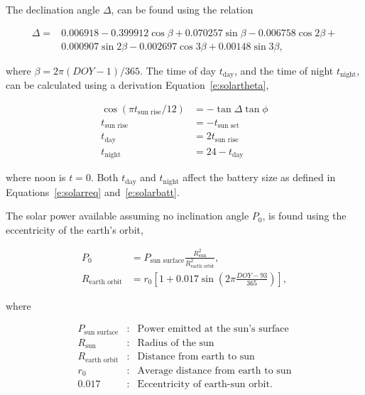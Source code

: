 \documentclass[]{aiaa-tc}%
\begin{document}
 The declination angle $\Delta$, can be found using the relation\cite{solar} 

    \begin{align}
        \label{e:solardelta}
        \Delta = &0.006918 - 0.399912 \cos{\beta} + 0.070257\sin{\beta} - 0.006758\cos{2\beta} + \nonumber \\
        & 0.000907\sin{2\beta} - 0.002697\cos{3\beta} + 0.00148\sin{3\beta},
    \end{align}

    where $\beta = 2\pi (DOY-1)/365$.
    The time of day $t_{\text{day}}$, and the time of night $t_{\text{night}}$, can be calculated using a derivation Equation~\eqref{e:solartheta}, \cite{solar}

    \begin{align}
        \label{e:solartday}
        \cos{(\pi t_{\text{sun rise}}/12)} &= -\tan{\Delta} \tan{\phi} \\
        \label{e:solarsunrise}
        t_{\text{sun rise}} &= -t_{\text{sun set}} \\
        \label{e:solartday2}
        t_{\text{day}} &= 2t_{\text{sun rise}} \\
        \label{e:solartnight}
        t_{\text{night}} &= 24 - t_{\text{day}}
    \end{align}

    where noon is $t=0$. Both $t_{\text{day}}$ and $t_{\text{night}}$ affect the battery size as defined in Equations~\eqref{e:solarreq} and~\eqref{e:solarbatt}. 

    The solar power available assuming no inclination angle $P_0$, is found using the eccentricity of the earth's orbit, 

    \begin{align}
        \label{e:solarp0}
        P_0 & = P_{\text{sun surface}} \frac{R_{\text{sun}}^2}{R_{\text{earth orbit}}^2}, \\
        \label{e:solareo}
        R_{\text{earth orbit}} & = r_0 \left[ 1 + 0.017 \sin{\left( 2\pi \frac{DOY-93}{365}\right)} \right],
    \end{align}
    
    where 

    \[ \begin{array}{lcl}
        P_{\text{sun surface}} & : & \text{Power emitted at the sun's surface} \\
        R_{\text{sun}} & : & \text{Radius of the sun} \\
        R_{\text{earth orbit}} & : & \text{Distance from earth to sun} \\
        r_0 & : & \text{Average distance from earth to sun} \\
        0.017 & : & \text{Eccentricity of earth-sun orbit}.
    \end{array} \]
\end{document}

